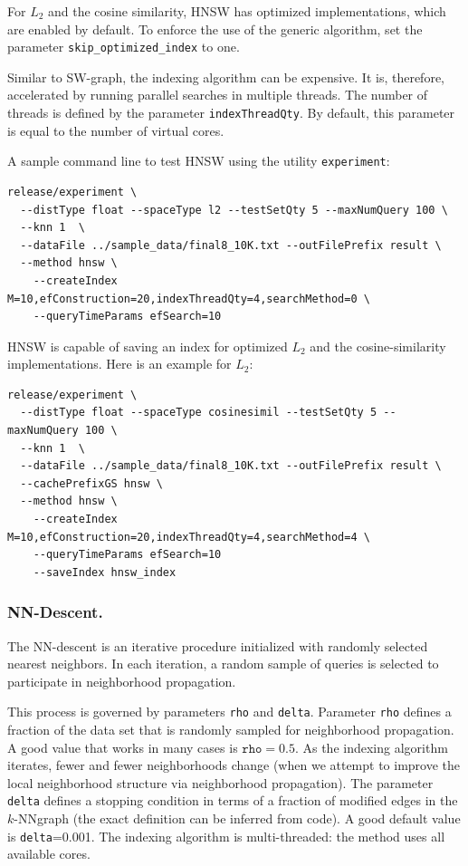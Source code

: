 \documentclass[runningheads,a4paper]{llncs}
\newcommand{\ttt}[1]{\texttt{#1}}
\newcommand{\knnns}{$k$-NN}
\begin{document}
For $L_2$ and the cosine similarity, HNSW has optimized implementations, which are enabled by default.
To enforce the use of the generic algorithm, set the parameter \ttt{skip\_optimized\_index} to one.

Similar to SW-graph, the indexing algorithm can be expensive. 
It is, therefore, accelerated by running parallel searches in multiple threads. 
The number of threads is defined by the
parameter \ttt{indexThreadQty}. By default, this parameter is equal to the number
of virtual cores.

A sample command line to test HNSW using the utility \texttt{experiment}:
{
\footnotesize
\begin{verbatim}
release/experiment \
  --distType float --spaceType l2 --testSetQty 5 --maxNumQuery 100 \
  --knn 1  \
  --dataFile ../sample_data/final8_10K.txt --outFilePrefix result \
  --method hnsw \
    --createIndex M=10,efConstruction=20,indexThreadQty=4,searchMethod=0 \
    --queryTimeParams efSearch=10 
\end{verbatim}
}

HNSW is capable of saving an index for optimized $L_2$ and the cosine-similarity implementations. 
Here is an example for $L_2$:
{
\footnotesize
\begin{verbatim}
release/experiment \
  --distType float --spaceType cosinesimil --testSetQty 5 --maxNumQuery 100 \
  --knn 1  \
  --dataFile ../sample_data/final8_10K.txt --outFilePrefix result \
  --cachePrefixGS hnsw \
  --method hnsw \
    --createIndex M=10,efConstruction=20,indexThreadQty=4,searchMethod=4 \
    --queryTimeParams efSearch=10 
    --saveIndex hnsw_index
\end{verbatim}
}

\subsubsection{NN-Descent.} \label{SectionNNDescent}
The NN-descent is an iterative procedure initialized with randomly selected
nearest neighbors. In each iteration, a random sample of queries is selected
to participate in neighborhood propagation.

This process is governed by parameters \ttt{rho} and \ttt{delta}. 
Parameter \ttt{rho} defines a fraction of the data set that is randomly
sampled for neighborhood propagation. A good value that works
in many cases is $\ttt{rho}=0.5$. As the indexing algorithm iterates,
fewer and fewer neighborhoods change (when we attempt to improve the local
neighborhood structure via neighborhood propagation). 
The parameter \ttt{delta} defines a stopping condition in terms of a fraction
of modified edges in the \knnns graph (the exact definition can be inferred from code). 
A good default value is \ttt{delta}=0.001.
The indexing algorithm is multi-threaded: the method uses all available cores.
\end{document}
